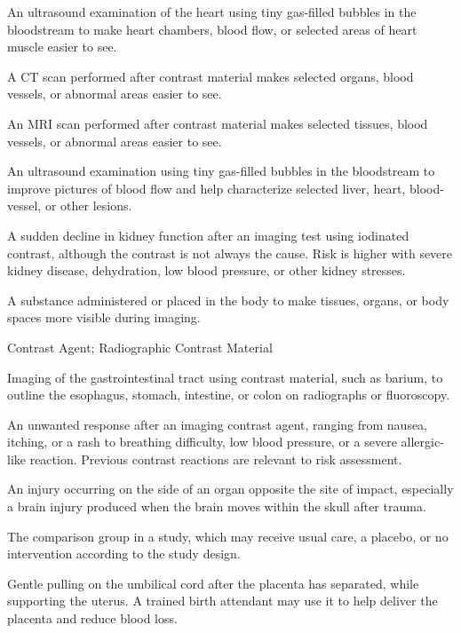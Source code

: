  An ultrasound examination of the heart using tiny gas-filled bubbles in the bloodstream to make heart chambers, blood flow, or selected areas of heart muscle easier to see.

 A CT scan performed after contrast material makes selected organs, blood vessels, or abnormal areas easier to see.

 An MRI scan performed after contrast material makes selected tissues, blood vessels, or abnormal areas easier to see.

 An ultrasound examination using tiny gas-filled bubbles in the bloodstream to improve pictures of blood flow and help characterize selected liver, heart, blood-vessel, or other lesions.

 A sudden decline in kidney function after an imaging test using iodinated contrast, although the contrast is not always the cause. Risk is higher with severe kidney disease, dehydration, low blood pressure, or other kidney stresses.

 A substance administered or placed in the body to make tissues, organs, or body spaces more visible during imaging.

\synonyms
Contrast Agent; Radiographic Contrast Material

 Imaging of the gastrointestinal tract using contrast material, such as barium, to outline the esophagus, stomach, intestine, or colon on radiographs or fluoroscopy.

 An unwanted response after an imaging contrast agent, ranging from nausea, itching, or a rash to breathing difficulty, low blood pressure, or a severe allergic-like reaction. Previous contrast reactions are relevant to risk assessment.

 An injury occurring on the side of an organ opposite the site of impact, especially a
brain injury produced when the brain moves within the skull after trauma.

 The comparison group in a study, which may receive usual care, a placebo, or no intervention according to the study design.

 Gentle pulling on the umbilical cord after the placenta has separated, while supporting the uterus. A trained birth attendant may use it to help deliver the placenta and reduce blood loss.

